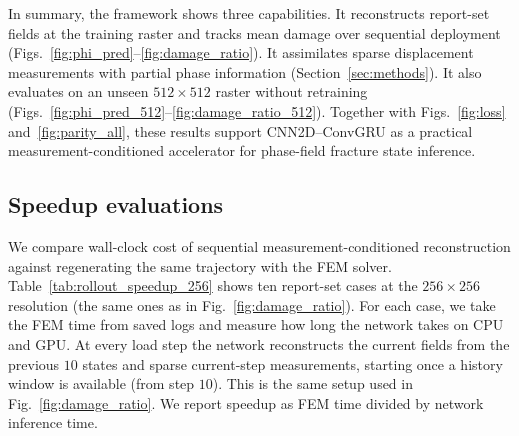 \documentclass[10pt]{article}
\theoremstyle{definition}
\begin{document}
In summary, the framework shows three capabilities.
%
It reconstructs report-set fields at the training raster and tracks mean damage over sequential deployment (Figs.~\ref{fig:phi_pred}--\ref{fig:damage_ratio}).
%
It assimilates sparse displacement measurements with partial phase information (Section~\ref{sec:methods}).
%
It also evaluates on an unseen $512\times512$ raster without retraining (Figs.~\ref{fig:phi_pred_512}--\ref{fig:damage_ratio_512}).
%
Together with Figs.~\ref{fig:loss} and~\ref{fig:parity_all}, these results support CNN2D--ConvGRU as a practical measurement-conditioned accelerator for phase-field fracture state inference.

\subsection{Speedup evaluations}

We compare wall-clock cost of sequential measurement-conditioned reconstruction against regenerating the same trajectory with the FEM solver.
%
Table~\ref{tab:rollout_speedup_256} shows ten report-set cases at the $256\times256$ resolution (the same ones as in Fig.~\ref{fig:damage_ratio}).
%
For each case, we take the FEM time from saved logs and measure how long the network takes on CPU and GPU.
%
At every load step the network reconstructs the current fields from the previous $10$ states and sparse current-step measurements, starting once a history window is available (from step $10$).
%
This is the same setup used in Fig.~\ref{fig:damage_ratio}.
%
We report speedup as FEM time divided by network inference time.
\end{document}
